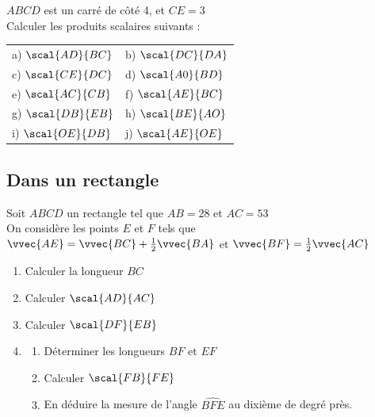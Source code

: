 \documentclass[oneside,12pt]{book}          %
\begin{document}
\begin{minipage}{0.5\textwidth}
\end{minipage}
\begin{minipage}{0.5\textwidth}
$ABCD$ est un carré de côté 4, et $CE=3$ \\[5pt]
Calculer les produits scalaires suivants :\\[5pt]
\renewcommand{\arraystretch}{1.3}
\begin{tabular}{p{} p{}}
    a) $\scal{AD}{BC}$ & b) $\scal{DC}{DA}$ \\
    c) $\scal{CE}{DC}$ & d) $\scal{A0}{BD}$ \\
    e) $\scal{AC}{CB}$ & f) $\scal{AE}{BC}$ \\
    g) $\scal{DB}{EB}$ & h) $\scal{BE}{AO}$ \\
    i) $\scal{OE}{DB}$ & j) $\scal{AE}{OE}$ \\
\end{tabular}
\end{minipage}



\subsection{Dans un rectangle}

Soit $ABCD$ un rectangle tel que $AB=28$ et $AC=53$ \\
On considère les points $E$ et $F$ tels que $\vvec{AE}=\vvec{BC}+\frac{1}{2}\vvec{BA}$ et $\vvec{BF}=\frac{1}{2}\vvec{AC}$
\begin{enumerate}
	\item Calculer la longueur $BC$
    \item Calculer $\scal{AD}{AC}$
    \item Calculer $\scal{DF}{EB}$
    \item \begin{enumerate}
    	\item Déterminer les longueurs $BF$ et $EF$
    	\item Calculer $\scal{FB}{FE}$
    	\item En déduire la mesure de l'angle $\widehat{BFE}$ au dixième de degré près.
    \end{enumerate}
\end{enumerate}
\end{document}
